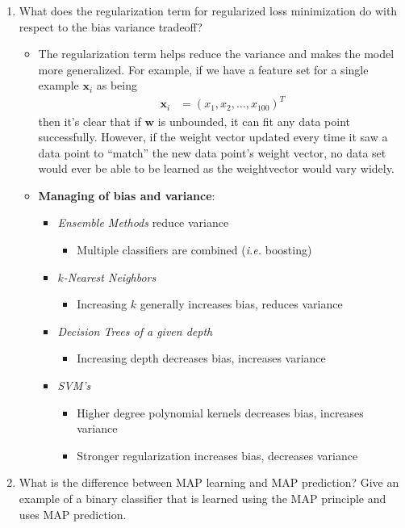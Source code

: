 \documentclass{article}
\newcommand{\bx}{\mathbf{x}}
\newcommand{\bw}{\mathbf{w}}
\begin{document}
\begin{enumerate}
\item What does the regularization term for regularized loss minimization do with respect to the bias variance tradeoff?

\begin{itemize}
\item The regularization term helps reduce the variance and makes the model more generalized. For example, if we have a feature set for a single example $\bx_{i}$ as being
\begin{align}
\bx_{i} &= \left(x_{1},x_{2},\ldots,x_{100}\right)^{T}
\end{align}
then it's clear that if $\bw$ is unbounded, it can fit any data point successfully. However, if the weight vector updated every time it saw a data point to ``match'' the new data point's weight vector, no data set would ever be able to be learned as the weightvector would vary widely. 
\item {\bf Managing of bias and variance}:
\begin{itemize}
\item {\em Ensemble Methods} reduce variance
\begin{itemize}
\item Multiple classifiers are combined ({\em i.e.} boosting)
\end{itemize}
\item {\em $k$-Nearest Neighbors}
\begin{itemize}
\item Increasing $k$ generally increases bias, reduces variance
\end{itemize}
\item {\em Decision Trees of a given depth}
\begin{itemize}
\item Increasing depth decreases bias, increases variance
\end{itemize}
\item {\em SVM's}
\begin{itemize}
\item Higher degree polynomial kernels decreases bias, increases variance
\item Stronger regularization increases bias, decreases variance
\end{itemize}
\end{itemize}
\end{itemize}


\item What is the difference between MAP learning and MAP prediction? Give an example of a binary classifier that is learned using the MAP principle and uses MAP prediction.


\end{enumerate}
\end{document}
